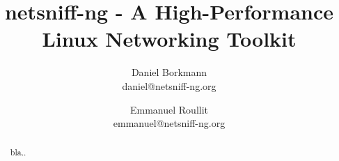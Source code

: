 \documentclass[times,10pt,twocolumn]{article}
\begin{document}
\title{netsniff-ng - A High-Performance Linux Networking Toolkit}

\author{Daniel Borkmann\\
daniel@netsniff-ng.org\\
\and
Emmanuel Roullit\\
emmanuel@netsniff-ng.org\\
}

\maketitle
\thispagestyle{empty}

\begin{abstract}
bla..
\end{abstract}




\nocite{*}


\end{document}
